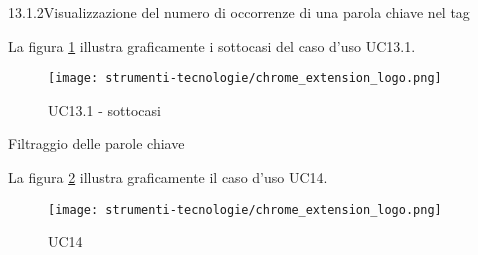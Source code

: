 \begin{usecase}{13.1.2}{Visualizzazione del numero di occorrenze di una parola chiave nel tag}\label{UC13point1point2}
\end{usecase}

\vspace{10pt}
\par\noindent
\begin{minipage}{\textwidth}
    La figura \ref{fig:uc13_1_sottocasi} illustra graficamente i sottocasi del caso d'uso UC13.1.
    \begin{figure}[H]
        \centering
        \texttt{[image: strumenti-tecnologie/chrome\_extension\_logo.png]} 
        \caption{UC13.1 - sottocasi}
        \label{fig:uc13_1_sottocasi}
    \end{figure}
\end{minipage}

\begin{usecase}{14}{Filtraggio delle parole chiave}\label{UC14}
\end{usecase}

\vspace{10pt}
\par\noindent
\begin{minipage}{\textwidth}
    La figura \ref{fig:uc14} illustra graficamente il caso d'uso UC14.
    \begin{figure}[H]
    \centering
    \texttt{[image: strumenti-tecnologie/chrome\_extension\_logo.png]} 
    \caption{UC14}
    \label{fig:uc14}
    \end{figure}
\end{minipage}

